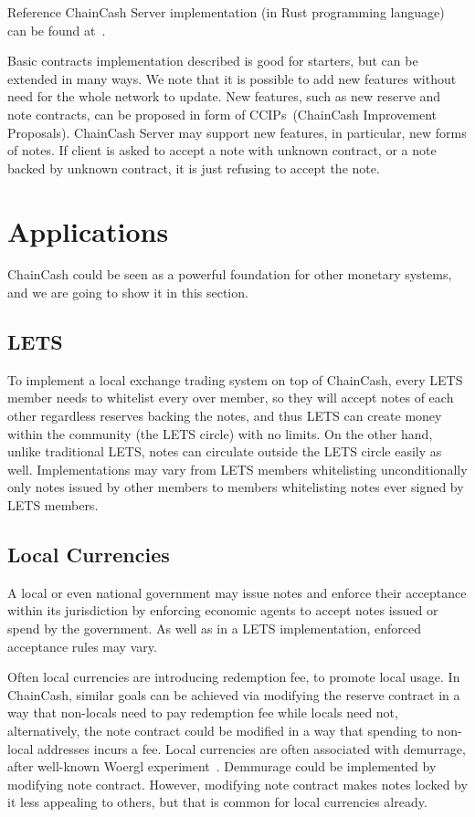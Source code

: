 \documentclass{llncs}   %
\newcommand{\cc}{ChainCash}
\begin{document}
Reference \cc{} Server implementation (in Rust programming language) can be found at~\cite{server}.

Basic contracts implementation described is good for starters, but can be extended in many ways.  We note that it is possible
to add new features without need for the whole network to update. New features, such as new reserve and note contracts,
can be proposed in form of CCIPs~(ChainCash Improvement Proposals). ChainCash
Server may support new features, in particular, new forms of notes. If client is asked to accept a note with unknown
contract, or a note backed by unknown contract, it is just refusing to accept the note.

\section{Applications}
\label{sec-apps}

\cc{} could be seen as a powerful foundation for other monetary systems, and we are going to show it in this section. 

\subsection{LETS}

To implement a local exchange trading system on top of \cc{}, every LETS member needs to whitelist every over member, so they will accept notes of each other regardless reserves backing the notes, and thus LETS can create money within the community (the LETS circle) with no limits. On the other hand, unlike traditional LETS, notes can circulate outside the LETS circle easily as well. Implementations may vary from LETS members whitelisting unconditionally only notes issued by other members to members whitelisting notes ever signed by LETS members. 


\subsection{Local Currencies}

A local or even national government may issue notes and enforce their acceptance within its jurisdiction by enforcing economic agents to accept notes issued or spend by the government. As well as in a LETS implementation, enforced acceptance rules may vary. 

Often local currencies are introducing redemption fee, to promote local usage. In \cc{}, similar goals can be achieved via modifying the reserve contract in a way that non-locals need to pay redemption fee while locals need not, alternatively, the note contract could be modified in a way that spending to non-local addresses incurs a fee. Local currencies are often associated with demurrage, after well-known Woergl experiment~\cite{unterguggenbercer1934end}. Demmurage could be implemented by modifying note contract. However, modifying note contract makes notes locked by it less appealing to others, but that is common for local currencies already.
\end{document}

